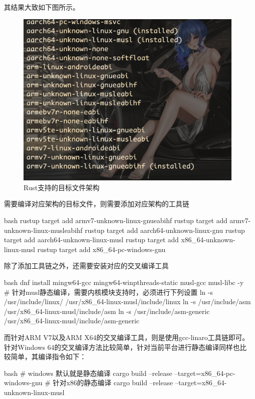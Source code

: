 其结果大致如下图所示。
\begin{figure}[H]
  \centering
  \includegraphics[width=\linewidth]{rust_target.png}
  \caption{Rust支持的目标文件架构}
  \label{fig:rust_target}
\end{figure}

需要编译对应架构的目标文件，则需要添加对应架构的工具链
\begin{code-block}{bash}
rustup target add armv7-unknown-linux-gnueabihf
rustup target add armv7-unknown-linux-musleabihf
rustup target add aarch64-unknown-linux-gnu
rustup target add aarch64-unknown-linux-musl
rustup target add x86_64-unknown-linux-musl
rustup target add x86_64-pc-windows-gnu
\end{code-block}

除了添加工具链之外，还需要安装对应的交叉编译工具
\begin{code-block}{bash}
dnf install mingw64-gcc mingw64-winpthreads-static musl-gcc musl-libc -y
# 针对musl静态编译，需要内核模块支持时，必须进行下列设置
ln -s /usr/include/linux/ /usr/x86_64-linux-musl/include/linux
ln -s /usr/include/asm /usr/x86_64-linux-musl/include/asm
ln -s /usr/include/asm-generic /usr/x86_64-linux-musl/include/asm-generic
\end{code-block}

而针对ARM V7以及ARM X64的交叉编译工具，则是使用gcc-linaro工具链即可。
针对Windows 64的交叉编译方法比较简单，针对当前平台进行静态编译同样也比较简单，其编译指令如下：
\begin{code-block}{bash}
# windows 默认就是静态编译
cargo build --release --target=x86_64-pc-windows-gnu
# 针对x86的静态编译
cargo build --release --target=x86_64-unknown-linux-musl
\end{code-block}

